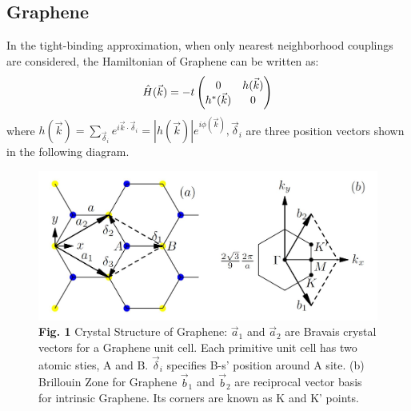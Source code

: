\documentclass[letterpaper,10pt,english]{sphinxmanual}
\begin{document}
\subsection{Graphene}
\label{TI/Weyl_semi-metal:graphene}
In the tight-binding approximation, when only nearest neighborhood couplings are considered, the Hamiltonian of Graphene can be written as:
\begin{gather}
\begin{split}\hat{H}(\vec{k})=-t\begin{pmatrix}0 &h(\vec{k})\\h^*(\vec{k}) &0\end{pmatrix}\end{split}\notag
\end{gather}
where \(h(\vec{k})=\sum\limits_{\vec{\delta}_i}e^{i\vec{k}\cdot\vec{\delta}_i}=|h(\vec{k})|e^{i\phi(\vec{k})},\vec{\delta}_i\) are three position vectors shown in the following diagram.
\begin{figure}[htbp]
\centering
\capstart

\includegraphics[width=0.700\linewidth]{1.png}
\caption{\textbf{Fig. 1}  Crystal Structure of Graphene: \(\vec{a}_{1}\) and \(\vec{a}_{2}\)
are Bravais crystal vectors for a Graphene unit cell. Each primitive
unit cell has two atomic sties, A and B. \(\vec{\delta}_{i}\) specifies
B-s' position around A site. (b) Brillouin Zone for Graphene
\(\vec{b}_{1}\) and \(\vec{b}_{2}\) are reciprocal vector basis for
intrinsic Graphene. Its corners are known as K and K' points.}\end{figure}
\end{document}
